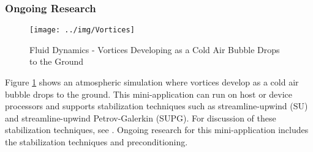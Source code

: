 \subsubsection{Ongoing Research}
\begin{figure}[ht!]
\texttt{[image: ../img/Vortices]}
\caption{Fluid Dynamics - Vortices Developing as a Cold Air Bubble Drops to the Ground}
\label{fig:vortices}
\end{figure}

Figure \ref{fig:vortices} shows an atmospheric simulation where vortices develop as a cold air bubble drops to the ground.
This mini-application can run on host or device processors and supports stabilization techniques such as streamline-upwind (SU) and streamline-upwind Petrov-Galerkin (SUPG).
For discussion of these stabilization techniques, see \cite{hughes2010stabilized}.
Ongoing research for this mini-application includes the stabilization techniques and preconditioning.